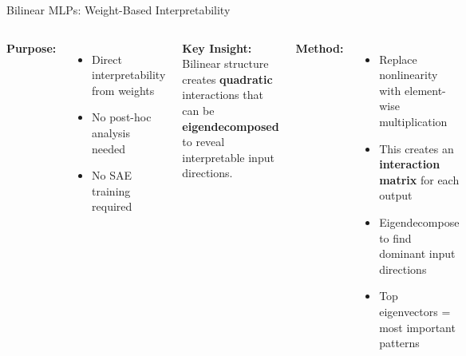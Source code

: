 
\begin{frame}{Bilinear MLPs: Weight-Based Interpretability}
    \begin{columns}
        \textbf{Purpose:}
        \begin{itemize}
            \item Direct interpretability from weights
            \item No post-hoc analysis needed
            \item No SAE training required
        \end{itemize}
        
        \vspace{0.3cm}
        \textbf{Key Insight:}\\
        Bilinear structure creates \textbf{quadratic} interactions that can be \textbf{eigendecomposed} to reveal interpretable input directions.
        
        \textbf{Method:}
        \begin{itemize}
            \item Replace nonlinearity with element-wise multiplication
            \item This creates an \textbf{interaction matrix} for each output
            \item Eigendecompose to find dominant input directions
            \item Top eigenvectors = most important patterns
        \end{itemize}
    \end{columns}
\end{frame}

